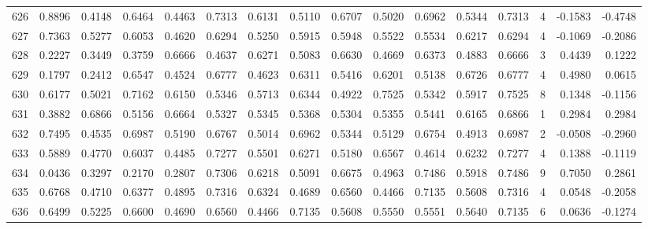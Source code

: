 \begin{tabular}{lrrrrrrrrrrrrrrr}
626 &      0.8896 &  0.4148 &  0.6464 &  0.4463 &  0.7313 &  0.6131 &  0.5110 &  0.6707 &  0.5020 &  0.6962 &   0.5344 &     0.7313 &      4 &                   -0.1583 &                    -0.4748 \\
627 &      0.7363 &  0.5277 &  0.6053 &  0.4620 &  0.6294 &  0.5250 &  0.5915 &  0.5948 &  0.5522 &  0.5534 &   0.6217 &     0.6294 &      4 &                   -0.1069 &                    -0.2086 \\
628 &      0.2227 &  0.3449 &  0.3759 &  0.6666 &  0.4637 &  0.6271 &  0.5083 &  0.6630 &  0.4669 &  0.6373 &   0.4883 &     0.6666 &      3 &                    0.4439 &                     0.1222 \\
629 &      0.1797 &  0.2412 &  0.6547 &  0.4524 &  0.6777 &  0.4623 &  0.6311 &  0.5416 &  0.6201 &  0.5138 &   0.6726 &     0.6777 &      4 &                    0.4980 &                     0.0615 \\
630 &      0.6177 &  0.5021 &  0.7162 &  0.6150 &  0.5346 &  0.5713 &  0.6344 &  0.4922 &  0.7525 &  0.5342 &   0.5917 &     0.7525 &      8 &                    0.1348 &                    -0.1156 \\
631 &      0.3882 &  0.6866 &  0.5156 &  0.6664 &  0.5327 &  0.5345 &  0.5368 &  0.5304 &  0.5355 &  0.5441 &   0.6165 &     0.6866 &      1 &                    0.2984 &                     0.2984 \\
632 &      0.7495 &  0.4535 &  0.6987 &  0.5190 &  0.6767 &  0.5014 &  0.6962 &  0.5344 &  0.5129 &  0.6754 &   0.4913 &     0.6987 &      2 &                   -0.0508 &                    -0.2960 \\
633 &      0.5889 &  0.4770 &  0.6037 &  0.4485 &  0.7277 &  0.5501 &  0.6271 &  0.5180 &  0.6567 &  0.4614 &   0.6232 &     0.7277 &      4 &                    0.1388 &                    -0.1119 \\
634 &      0.0436 &  0.3297 &  0.2170 &  0.2807 &  0.7306 &  0.6218 &  0.5091 &  0.6675 &  0.4963 &  0.7486 &   0.5918 &     0.7486 &      9 &                    0.7050 &                     0.2861 \\
635 &      0.6768 &  0.4710 &  0.6377 &  0.4895 &  0.7316 &  0.6324 &  0.4689 &  0.6560 &  0.4466 &  0.7135 &   0.5608 &     0.7316 &      4 &                    0.0548 &                    -0.2058 \\
636 &      0.6499 &  0.5225 &  0.6600 &  0.4690 &  0.6560 &  0.4466 &  0.7135 &  0.5608 &  0.5550 &  0.5551 &   0.5640 &     0.7135 &      6 &                    0.0636 &                    -0.1274 \\

\end{tabular}
